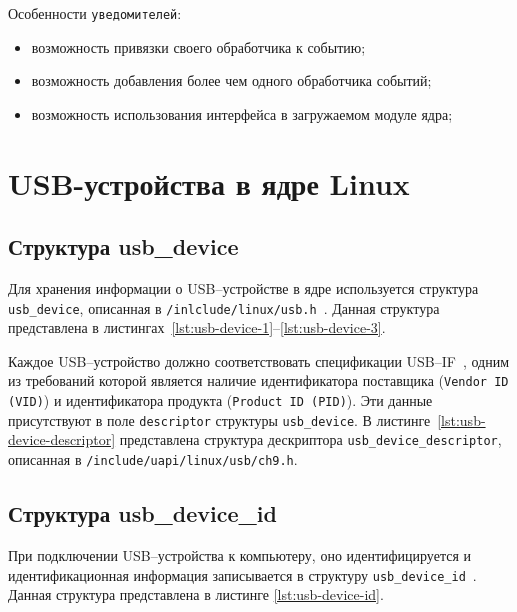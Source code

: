 Особенности \texttt{уведомителей}:

\begin{itemize}
	\item возможность привязки своего обработчика к событию;
	\item возможность добавления более чем одного обработчика событий;
	\item возможность использования интерфейса в загружаемом модуле ядра;
\end{itemize}

\section{USB-устройства в ядре Linux}

\subsection{Структура usb\_device}

Для хранения информации о USB--устройстве в ядре используется структура \texttt{usb\_device}, описанная в \texttt{/inlclude/linux/usb.h}~\cite{usb_device}. Данная структура представлена в листингах~\ref{lst:usb-device-1}--\ref{lst:usb-device-3}.

Каждое USB--устройство должно соответствовать спецификации USB--IF~\cite{usbspec}, одним из требований которой является наличие идентификатора поставщика (\texttt{Vendor ID (VID)}) и идентификатора продукта (\texttt{Product ID (PID)}). Эти данные присутствуют в поле \texttt{descriptor} структуры \texttt{usb\_device}. В листинге~\ref{lst:usb-device-descriptor} представлена структура дескриптора \texttt{usb\_device\_descriptor}, описанная в \texttt{/include/uapi/linux/usb/ch9.h}.

\subsection{Структура usb\_device\_id}

При подключении USB--устройства к компьютеру, оно идентифицируется и идентификационная информация записывается в структуру \texttt{usb\_device\_id}~\cite{usb_device_id}. Данная структура представлена в листинге \ref{lst:usb-device-id}.
